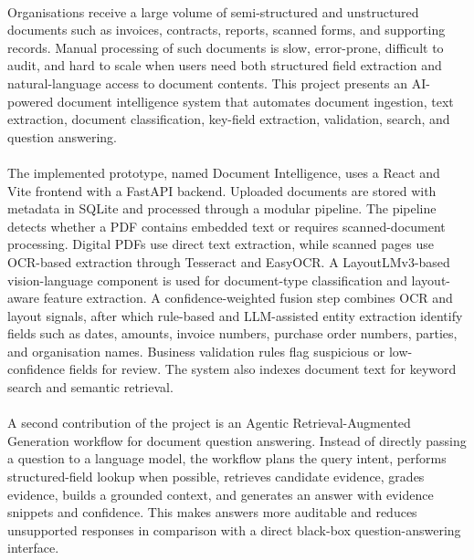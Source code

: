 \paragraph{} Organisations receive a large volume of semi-structured and unstructured documents such as invoices, contracts, reports, scanned forms, and supporting records. Manual processing of such documents is slow, error-prone, difficult to audit, and hard to scale when users need both structured field extraction and natural-language access to document contents. This project presents an AI-powered document intelligence system that automates document ingestion, text extraction, document classification, key-field extraction, validation, search, and question answering.

\paragraph{} The implemented prototype, named Document Intelligence, uses a React and Vite frontend with a FastAPI backend. Uploaded documents are stored with metadata in SQLite and processed through a modular pipeline. The pipeline detects whether a PDF contains embedded text or requires scanned-document processing. Digital PDFs use direct text extraction, while scanned pages use OCR-based extraction through Tesseract and EasyOCR. A LayoutLMv3-based vision-language component is used for document-type classification and layout-aware feature extraction. A confidence-weighted fusion step combines OCR and layout signals, after which rule-based and LLM-assisted entity extraction identify fields such as dates, amounts, invoice numbers, purchase order numbers, parties, and organisation names. Business validation rules flag suspicious or low-confidence fields for review. The system also indexes document text for keyword search and semantic retrieval.

\paragraph{} A second contribution of the project is an Agentic Retrieval-Augmented Generation workflow for document question answering. Instead of directly passing a question to a language model, the workflow plans the query intent, performs structured-field lookup when possible, retrieves candidate evidence, grades evidence, builds a grounded context, and generates an answer with evidence snippets and confidence. This makes answers more auditable and reduces unsupported responses in comparison with a direct black-box question-answering interface.

